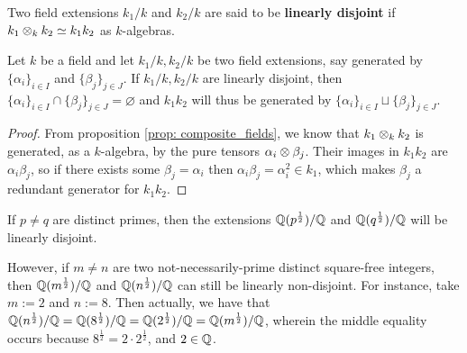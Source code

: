         \begin{definition} \label{def: linearly_disjoint_extensions}
            Two field extensions $k_1/k$ and $k_2/k$ are said to be \textbf{linearly disjoint} if $k_1 \tensor_k k_2 \cong k_1 k_2$ as $k$-algebras.
        \end{definition}
        \begin{lemma} \label{lemma: linearly_disjoint_generators}
            Let $k$ be a field and let $k_1/k, k_2/k$ be two field extensions, say generated by $\{\alpha_i\}_{i \in I}$ and $\{\beta_j\}_{j \in J}$. If $k_1/k, k_2/k$ are linearly disjoint, then $\{\alpha_i\}_{i \in I} \cap \{\beta_j\}_{j \in J} = \varnothing$ and $k_1 k_2$ will thus be generated by $\{\alpha_i\}_{i \in I} \sqcup\{\beta_j\}_{j \in J}$. 
        \end{lemma}
            \begin{proof}
                From proposition \ref{prop: composite_fields}, we know that $k_1 \tensor_k k_2$ is generated, as a $k$-algebra, by the pure tensors $\alpha_i \tensor \beta_j$. Their images in $k_1 k_2$ are $\alpha_i \beta_j$, so if there exists some $\beta_j = \alpha_i$ then $\alpha_i \beta_j = \alpha_i^2 \in k_1$, which makes $\beta_j$ a redundant generator for $k_1 k_2$.
            \end{proof}
        \begin{example}
            If $p \not = q$ are distinct primes, then the extensions $\mathbb{Q}(p^{\frac12})/\mathbb{Q}$ and $\mathbb{Q}(q^{\frac12})/\mathbb{Q}$ will be linearly disjoint.
            
            However, if $m \not = n$ are two not-necessarily-prime distinct square-free integers, then $\mathbb{Q}(m^{\frac12})/\mathbb{Q}$ and $\mathbb{Q}(n^{\frac12})/\mathbb{Q}$ can still be linearly non-disjoint. For instance, take $m := 2$ and $n := 8$. Then actually, we have that $\mathbb{Q}(n^{\frac12})/\mathbb{Q} = \mathbb{Q}(8^{\frac12})/\mathbb{Q} = \mathbb{Q}(2^{\frac12})/\mathbb{Q} = \mathbb{Q}(m^{\frac12})/\mathbb{Q}$, wherein the middle equality occurs because $8^{\frac12} = 2 \cdot 2^{\frac12}$, and $2 \in \mathbb{Q}$.
        \end{example}


